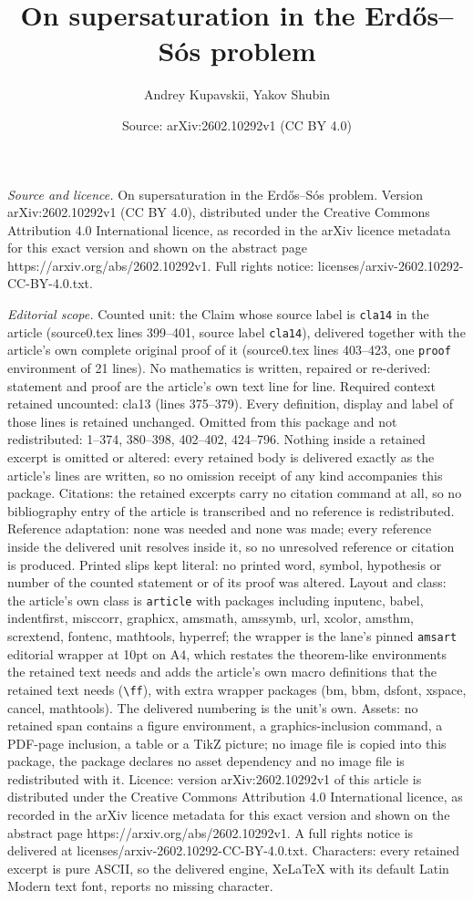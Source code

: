 \documentclass[10pt,a4paper]{amsart}
\title[On supersaturation in the Erd\H{o}s--S\'os problem]{On supersaturation in the Erd\H{o}s--S\'os problem}
\author{Andrey Kupavskii, Yakov Shubin}
\date{Source: arXiv:2602.10292v1 (CC BY 4.0)}
\begin{document}
\maketitle

\noindent\emph{Source and licence.} On supersaturation in the Erd\H{o}s--S\'os problem. Version arXiv:2602.10292v1 (CC BY 4.0), distributed under the Creative Commons Attribution 4.0 International licence, as recorded in the arXiv licence metadata for this exact version and shown on the abstract page https://arxiv.org/abs/2602.10292v1. Full rights notice: licenses/arxiv-2602.10292-CC-BY-4.0.txt.\par\smallskip

\noindent\textit{Editorial scope.} Counted unit: the Claim whose source label is \texttt{cla14} in the article (source0.tex lines 399--401, source label \texttt{cla14}), delivered together with the article's own complete original proof of it (source0.tex lines 403--423, one \texttt{proof} environment of 21 lines). No mathematics is written, repaired or re-derived: statement and proof are the article's own text line for line. Required context retained uncounted: cla13 (lines 375--379). Every definition, display and label of those lines is retained unchanged. Omitted from this package and not redistributed: 1--374, 380--398, 402--402, 424--796. Nothing inside a retained excerpt is omitted or altered: every retained body is delivered exactly as the article's lines are written, so no omission receipt of any kind accompanies this package. Citations: the retained excerpts carry no citation command at all, so no bibliography entry of the article is transcribed and no reference is redistributed. Reference adaptation: none was needed and none was made; every reference inside the delivered unit resolves inside it, so no unresolved reference or citation is produced. Printed slips kept literal: no printed word, symbol, hypothesis or number of the counted statement or of its proof was altered. Layout and class: the article's own class is \texttt{article} with packages including inputenc, babel, indentfirst, misccorr, graphicx, amsmath, amssymb, url, xcolor, amsthm, scrextend, fontenc, mathtools, hyperref; the wrapper is the lane's pinned \texttt{amsart} editorial wrapper at 10pt on A4, which restates the theorem-like environments the retained text needs and adds the article's own macro definitions that the retained text needs (\texttt{\textbackslash ff}), with extra wrapper packages (bm, bbm, dsfont, xspace, cancel, mathtools). The delivered numbering is the unit's own. Assets: no retained span contains a figure environment, a graphics-inclusion command, a PDF-page inclusion, a table or a TikZ picture; no image file is copied into this package, the package declares no asset dependency and no image file is redistributed with it. Licence: version arXiv:2602.10292v1 of this article is distributed under the Creative Commons Attribution 4.0 International licence, as recorded in the arXiv licence metadata for this exact version and shown on the abstract page https://arxiv.org/abs/2602.10292v1. A full rights notice is delivered at licenses/arxiv-2602.10292-CC-BY-4.0.txt. Characters: every retained excerpt is pure ASCII, so the delivered engine, XeLaTeX with its default Latin Modern text font, reports no missing character.
\end{document}
